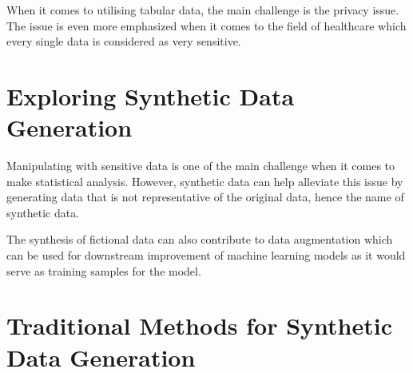 When it comes to utilising tabular data, the main challenge is the privacy issue. The issue is even more emphasized when it comes to the field of healthcare which every single data is considered as very sensitive. 

\section{Exploring Synthetic Data Generation}




Manipulating with sensitive data is one of the main challenge when it comes to make statistical analysis.
However, synthetic data can help alleviate this issue by generating data that is not representative of the original data, hence the name of synthetic data.

The synthesis of fictional data can also contribute to data augmentation which can be used for downstream improvement of machine learning models as it would serve as training samples for the model. 


\section{Traditional Methods for Synthetic Data Generation}








